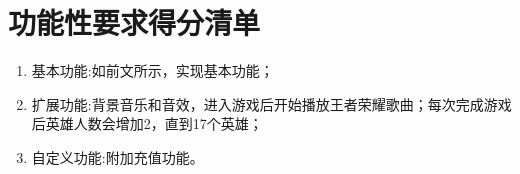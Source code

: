 \section{功能性要求得分清单}
\begin{enumerate}
    \item 基本功能:如前文所示，实现基本功能；
    \item 扩展功能:背景音乐和音效，进入游戏后开始播放王者荣耀歌曲；每次完成游戏后英雄人数会增加2，直到17个英雄；
    \item 自定义功能:附加充值功能。
\end{enumerate}







